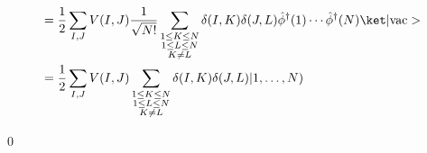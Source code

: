 \documentclass[uplatex,dvipdfmx,a4paper,11pt]{jlreq}
\makeatletter
\numberwithin{equation}{section}
\theoremstyle{definition}
\renewenvironment{proof}[1][\proofname]{\par
  \normalfont
  \topsep6\p@\@plus6\p@ \trivlist
  \item[\hskip\labelsep{\bfseries #1}\@addpunct{\bfseries}]\ignorespaces\quad\par
}{
  \qed\endtrivlist\@endpefalse
}
\renewcommand\proofname{証明}
\makeatother
\begin{document}
\begin{proof}
\begin{align}
     & = \frac{1}{2}\sum_{I,J}V(I, J)\frac{1}{\sqrt{N!}}\sum_{\substack{1\leq K\leq N                                                                                                                                                                                            \\ 1\leq L\leq N \\ K \neq L}}\delta(I, K)\delta(J, L)\hat{\phi}^\dagger(1)\cdots\hat{\phi}^\dagger(N)\ket|\mathrm{vac}>                                                                        \\
     & = \frac{1}{2}\sum_{I,J}V(I, J)\sum_{\substack{1\leq K\leq N                                                                                                                                                                                                               \\ 1\leq L\leq N \\ K \neq L}}\delta(I, K)\delta(J, L)|1,\ldots,N)
  \end{align}
\end{proof}
\end{document}
